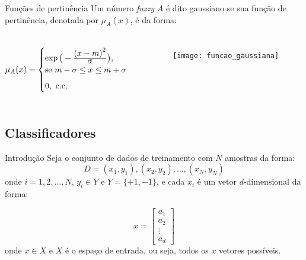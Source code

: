 \begin{frame}{Funções de pertinência}
Um número \emph{fuzzy} $A$ é dito gaussiano se sua função de pertinência, denotada por $\mu_{A}(x)$, é da forma:

\begin{columns}
\begin{equation*}
  \mu_A(x) =  \begin{cases}
                \exp{\big(-\ensuremath{\frac{\displaystyle {(x - m)}^2}{\displaystyle \sigma}} \big)}, \\ \text{se}\ m - \sigma \leq x \leq m + \sigma\\[0.5em]
                0, \ \text{c.c.}
              \end{cases}
\end{equation*}

\begin{figure}[!h]
  \centering
  \texttt{[image: funcao\_gaussiana]}
\end{figure}
\end{columns}
\end{frame}

\subsection{Classificadores}
\begin{frame}{Introdução}
Seja o conjunto de dados de treinamento com $N$ amostras da forma:
\begin{equation*}
    D = (x_1, y_1), (x_2, y_2), \ldots, (x_N, y_N)
\end{equation*}
\noindent onde $i = 1, 2, \ldots, N$, $y_i \in Y$ e $Y = \{+1, -1\}$, e cada $x_i$ é um vetor $d$-dimensional da forma:

\begin{equation*}
  x = 
  \begin{bmatrix}
    a_1 \\ a_2 \\ \vdots \\ a_d
  \end{bmatrix}
\end{equation*}
\noindent onde $x \in X$ e $X$ é o espaço de entrada, ou seja, todos os $x$ vetores possíveis.
\end{frame}

